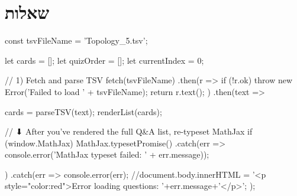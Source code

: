 \documentclass{tstextbook}
\begin{document}
\section{שאלות}


    const tsvFileName = 'Topology_5.tsv';

    let cards = [];
    let quizOrder = [];
    let currentIndex = 0;

    // 1) Fetch and parse TSV
fetch(tsvFileName)
  .then(r => {
    if (!r.ok) throw new Error('Failed to load ' + tsvFileName);
    return r.text();
  })
  .then(text => {
    cards = parseTSV(text);
    renderList(cards);

    // ⬇ After you’ve rendered the full Q&A list, re-typeset MathJax
    if (window.MathJax) {
      MathJax.typesetPromise()
        .catch(err => console.error('MathJax typeset failed: ' + err.message));
    }
  })
  .catch(err => {
    console.error(err);
    //document.body.innerHTML =  '<p style="color:red">Error loading questions: '+err.message+'</p>';
  });
\end{document}
